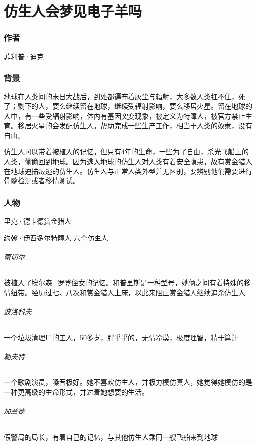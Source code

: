 \part{仿生人会梦见电子羊吗}
\section{作者}
{\kaishu 菲利普·迪克}
\section{背景}

地球在人类间的末日大战后，到处都遍布着灰尘与辐射，大多数人类扛不住，死了；剩下的人，要么继续留在地球，继续受辐射影响，要么移居火星。留在地球的人中，有一些受辐射影响，体内有基因突变现象，被定义为特障人，被官方禁止生育。移居火星的会发配仿生人，帮助完成一些生产工作，相当于人类的奴隶，没有自由。

仿生人可以带着被植入的记忆，但只有4年的生命，一些为了自由，杀光飞船上的人类，偷偷回到地球。因为逃入地球的仿生人对人类有着安全隐患，故有赏金猎人在地球追捕叛逃的仿生人。仿生人与正常人类外型并无区别，要辨别他们需要进行骨髓检测或者移情测试。	
\section{人物}
里克·德卡德\quad \quad 赏金猎人

约翰·伊西多尔\quad \quad 特障人
六个仿生人
	\paragraph{蕾切尔}
被植入了埃尔森·罗登侄女的记忆。和普里斯是一种型号，她俩之间有着特殊的移情纽带。经历过七、八次和赏金猎人上床，以此来阻止赏金猎人继续追杀仿生人

	\paragraph{波洛科夫}
一个垃圾清理厂的工人，50多岁，胖乎乎的，无情冷漠，极度理智，精于算计

	\paragraph{勒夫特}
一个歌剧演员，嗓音极好。她不喜欢仿生人，并极力模仿真人，她觉得她模仿的是一种更高级的生命形式，并过着她想要的生活。

	\paragraph{加兰德}
假警局的局长，有着自己的记忆，与其他仿生人乘同一艘飞船来到地球

